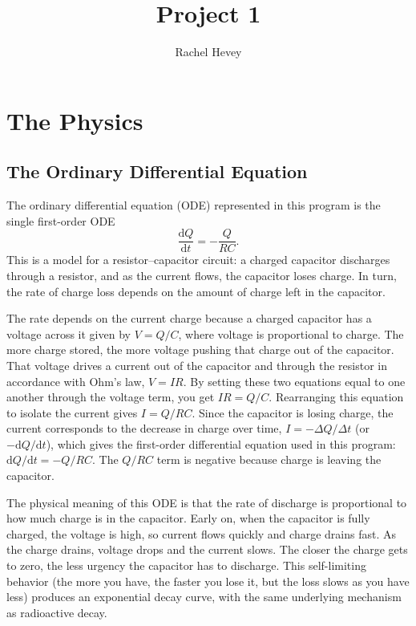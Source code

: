 \documentclass[11pt]{article}
\title{Project 1}
\author{Rachel Hevey}
\date{}
\newcommand{\dd}{\mathrm{d}}
\begin{document}
\maketitle

\section{The Physics}

\subsection{The Ordinary Differential Equation}

The ordinary differential equation (ODE) represented in this program is the single first-order ODE
\begin{equation}
  \frac{\dd Q}{\dd t} = -\frac{Q}{RC}.
\end{equation}
This is a model for a resistor--capacitor circuit: a charged capacitor discharges through a resistor, and as the current flows, the capacitor loses charge. In turn, the rate of charge loss depends on the amount of charge left in the capacitor.

The rate depends on the current charge because a charged capacitor has a voltage across it given by $V = Q/C$, where voltage is proportional to charge. The more charge stored, the more voltage pushing that charge out of the capacitor. That voltage drives a current out of the capacitor and through the resistor in accordance with Ohm's law, $V = IR$. By setting these two equations equal to one another through the voltage term, you get $IR = Q/C$. Rearranging this equation to isolate the current gives $I = Q/RC$. Since the capacitor is losing charge, the current corresponds to the decrease in charge over time, $I = -\Delta Q/\Delta t$ (or $-\dd Q/\dd t$), which gives the first-order differential equation used in this program: $\dd Q/\dd t = -Q/RC$. The $Q/RC$ term is negative because charge is leaving the capacitor.

The physical meaning of this ODE is that the rate of discharge is proportional to how much charge is in the capacitor. Early on, when the capacitor is fully charged, the voltage is high, so current flows quickly and charge drains fast. As the charge drains, voltage drops and the current slows. The closer the charge gets to zero, the less urgency the capacitor has to discharge. This self-limiting behavior (the more you have, the faster you lose it, but the loss slows as you have less) produces an exponential decay curve, with the same underlying mechanism as radioactive decay.
\end{document}
